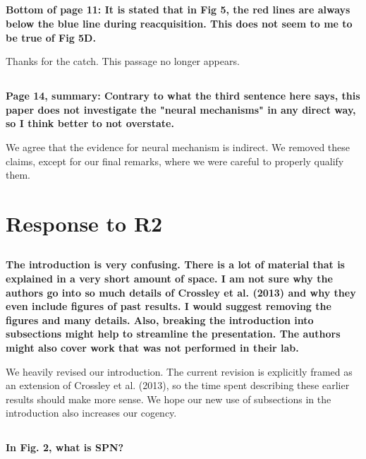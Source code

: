\documentclass[10pt,a4paper]{article}
\begin{document}
\subsection{} \textbf{
  Bottom of page 11: It is stated that in Fig 5, the red lines are always below
  the blue line during reacquisition. This does not seem to me to be true of Fig
  5D.
}

Thanks for the catch. This passage no longer appears.

\subsection{} \textbf{
  Page 14, summary: Contrary to what the third sentence here says, this paper does
  not investigate the "neural mechanisms" in any direct way, so I think better to
  not overstate.
}

We agree that the evidence for neural mechanism is indirect. We removed these
claims, except for our final remarks, where we were careful to properly qualify
them.

\section{Response to R2}

\subsection{} \textbf{
  The introduction is very confusing. There is a lot of material that is explained
  in a very short amount of space. I am not sure why the authors go into so much
  details of Crossley et al. (2013) and why they even include figures of past
  results. I would suggest removing the figures and many details. Also, breaking
  the introduction into subsections might help to streamline the presentation. The
  authors might also cover work that was not performed in their lab.
}

We heavily revised our introduction. The current revision is explicitly framed
as an extension of Crossley et al. (2013), so the time spent describing these
earlier results should make more sense. We hope our new use of subsections in
the introduction also increases our cogency.


\subsection{} \textbf{
  In Fig. 2, what is SPN?
}
\end{document}
